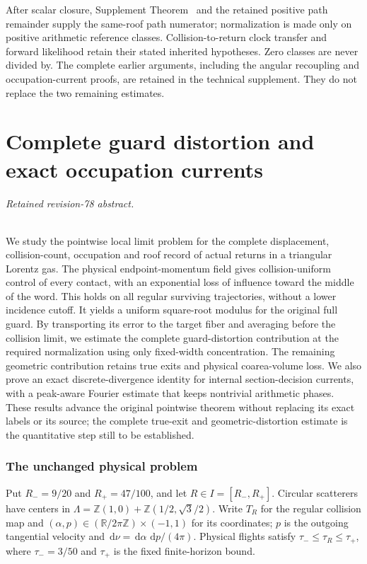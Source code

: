 \documentclass[11pt,reqno]{amsart}
\numberwithin{equation}{section}
\theoremstyle{definition}\newtheorem{definition}[theorem]{Definition}
\theoremstyle{remark}\newtheorem{remark}[theorem]{Remark}
\newcommand{\R}{\mathbb R}\newcommand{\Z}{\mathbb Z}\newcommand{\T}{\mathbb T}
\newcommand{\dd}{\,\mathrm d}\newcommand{\one}{\mathbf1}
\theoremstyle{definition}\newtheorem{inputstatement}[theorem]{Input statement}
\begin{document}
After scalar closure, Supplement Theorem~
and the retained positive path remainder supply the
same-roof path numerator; normalization is made only on positive
arithmetic reference classes. Collision-to-return clock transfer and
forward likelihood retain their stated inherited hypotheses. Zero
classes are never divided by. The complete earlier arguments, including
the angular recoupling and occupation-current proofs, are retained in
the technical supplement. They do not replace the two remaining estimates.


\endgroup
\part{Complete guard distortion and exact occupation currents}
\begingroup
\let\ArchiveLabel\label
\let\ArchiveRef\ref
\renewcommand{\label}[1]{\ArchiveLabel{v78archive:#1}}
\renewcommand{\ref}[1]{\ArchiveRef{v78archive:#1}}
\makeatletter
\let\ltx@label\label
\makeatother
\paragraph{Retained revision-78 abstract.}

We study the pointwise local limit problem for the complete displacement,
collision-count, occupation and roof record of actual returns in a
triangular Lorentz gas. The physical endpoint-momentum field gives
collision-uniform control of every contact, with an exponential loss
of influence toward the middle of the word. This holds on all regular
surviving trajectories, without a lower incidence cutoff. It yields a
uniform square-root modulus for the original full guard. By transporting
its error to the target fiber and averaging before the collision limit,
we estimate the complete guard-distortion contribution at the required
normalization using only fixed-width concentration. The remaining
geometric contribution retains true exits and physical coarea-volume
loss. We also prove an exact discrete-divergence identity for internal
section-decision currents, with a peak-aware Fourier estimate that keeps
nontrivial arithmetic phases. These results advance the original
pointwise theorem without replacing its exact labels or its source;
the complete true-exit and geometric-distortion estimate is the
quantitative step still to be established.



\section{The unchanged physical problem}
Put $R_-=9/20$ and $R_+=47/100$, and let $R\in I=[R_-,R_+]$. Circular scatterers have centers in
$\Lambda=\Z(1,0)+\Z(1/2,\sqrt3/2)$. Write $T_R$ for the regular
collision map and $(\alpha,p)\in(\R/2\pi\Z)\times(-1,1)$ for its
coordinates; $p$ is the outgoing tangential velocity and
$\dd\nu=\dd\alpha\,\dd p/(4\pi)$. Physical flights satisfy
$\tau_-\le\tau_R\le\tau_+$, where $\tau_-=3/50$ and $\tau_+$
is the fixed finite-horizon bound.
\end{document}
